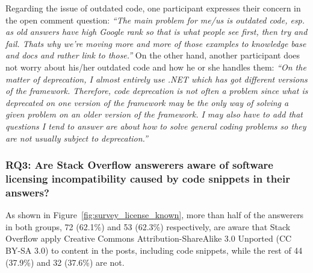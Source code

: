 \documentclass{svjour3}                     %
\begin{document}
Regarding the issue of outdated code, one participant expresses their concern
in the open comment question: \textit{``The main problem for me/us is outdated
	code, esp. as old answers have high Google rank so that is what people see
	first, then try and fail. Thats why we're moving more and more of those examples
	to knowledge base and docs and rather link to those.''} On the other hand,
another participant does not  worry about his/her outdated code and how he
or she handles them: \textit{``On
	the matter of deprecation, I almost entirely use .NET which has got different
	versions of the framework. Therefore, code deprecation is not often a problem
	since what is deprecated on one version of the framework may be the only way of
	solving a given problem on an older version of the framework. I may also have to
	add that questions I tend to answer are about how to solve general coding
	problems so they are not usually subject to deprecation.''}

\vspace{0.5cm} \noindent{}
\vspace{0.5cm}

\subsubsection*{RQ3: Are Stack Overflow answerers aware of software licensing
	incompatibility caused by code snippets in their answers?}

As shown in Figure~\ref{fig:survey_license_known}, more than half of the
answerers in both groups, 72 (62.1\%) and 53 (62.3\%) respectively, are aware that Stack
Overflow apply Creative Commons Attribution-ShareAlike 3.0 Unported (CC BY-SA
3.0) to content in the posts, including code snippets, while the rest of 44 (37.9\%)
and 32 (37.6\%) are not. 
\end{document}
